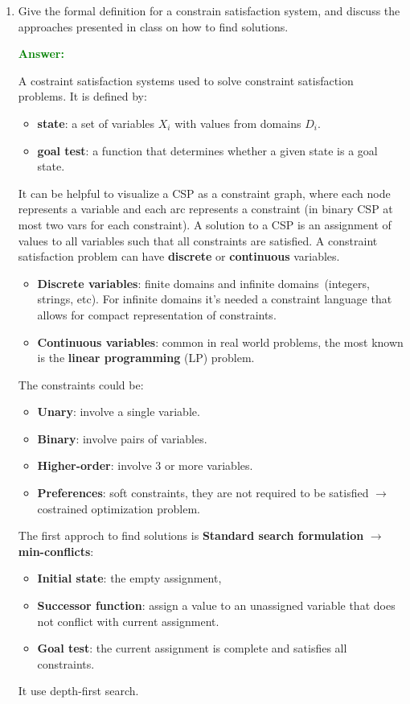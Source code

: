 \documentclass[12pt]{article}
\begin{document}
\begin{enumerate}
    \item Give the formal definition for a constrain satisfaction system, and discuss the approaches presented in class on how to find solutions.
    
    \textcolor{green}{\textbf{Answer:}}
    
    A costraint satisfaction systems used to solve constraint satisfaction problems.
    It is defined by:
    \begin{itemize}
        \item \textbf{state}: a set of variables $X_i$ with values from domains $D_i$.
        \item \textbf{goal test}: a function that determines whether a given state is a goal state.
    \end{itemize}

    It can be helpful to visualize a CSP as a constraint graph, where each node represents a variable and each arc represents a constraint (in binary CSP at most two vars for each constraint).
    A solution to a CSP is an assignment of values to all variables such that all constraints are satisfied.    
    A constraint satisfaction problem can have \textbf{discrete} or \textbf{continuous} variables.
    \begin{itemize}
        \item \textbf{Discrete variables}: finite domains and infinite domains\ (integers, strings, etc).
        For infinite domains it's needed a constraint language that allows for compact representation of constraints.
        \item \textbf{Continuous variables}: common in real world problems, the most known is the \textbf{linear programming} (LP) problem.
    \end{itemize}
    The constraints could be:
    \begin{itemize}
        \item \textbf{Unary}: involve a single variable.
        \item \textbf{Binary}: involve pairs of variables.
        \item \textbf{Higher-order}: involve 3 or more variables.
        \item \textbf{Preferences}: soft constraints, they are not required to be satisfied $\rightarrow$ costrained optimization problem.
    \end{itemize}

    The first approch to find solutions is \textbf{Standard search formulation} $\rightarrow$ \textbf{min-conflicts}:
    \begin{itemize}
        \item \textbf{Initial state}: the empty assignment, {}
        \item \textbf{Successor function}: assign a value to an unassigned variable that does not conflict with current assignment.
        \item \textbf{Goal test}: the current assignment is complete and satisfies all constraints.
    \end{itemize}
    It use depth-first search.


\end{enumerate}
\end{document}
